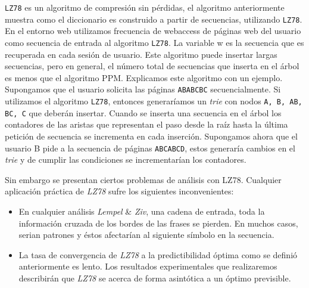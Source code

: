  


\texttt{LZ78} es un algoritmo de compresión sin pérdidas, el algoritmo anteriormente muestra  como el diccionario es construido  a partir de secuencias, utilizando \texttt{LZ78}. En el entorno web utilizamos frecuencia de webaccess de páginas web del usuario como secuencia de entrada al algoritmo \texttt{LZ78}. La variable w es la secuencia que es recuperada en cada sesión de usuario. Este algoritmo puede insertar largas secuencias, pero en general, el número total de secuencias que inserta en el árbol es menos que el algoritmo PPM. Explicamos este algoritmo con un ejemplo. Supongamos que el usuario solicita las páginas \texttt{ABABCBC} secuencialmente. Si utilizamos el algoritmo \texttt{LZ78}, entonces generaríamos un \emph{trie} con nodos  \texttt{A, B, AB, BC, C} que deberán insertar. 
Cuando se inserta una secuencia en el árbol los contadores de las aristas que representan el paso desde la raíz hasta la última petición de secuencia se incrementa en cada inserción. Supongamos ahora que el usuario B pide a la secuencia de páginas \texttt{ABCABCD}, estos generaría cambios en el \emph{trie} y de cumplir las condiciones se incrementarían los contadores. 






Sin embargo se presentan ciertos problemas de análisis con LZ78. Cualquier aplicación práctica de \emph{LZ78} sufre  los siguientes inconvenientes: 

\begin{itemize}
	\item En cualquier análisis \emph{Lempel} \& \emph{Ziv}, una cadena de entrada, toda la información cruzada de los bordes de las frases se pierden. En muchos casos, serian patrones y éstos afectarían al siguiente símbolo en la secuencia.
	
	\item La tasa de convergencia de \emph{LZ78} a la predictibilidad óptima como se definió anteriormente es lento. Los resultados experimentales que realizaremos  describirán que \emph{LZ78} se acerca de forma asintótica a un óptimo previsible.
	
	
	
\end{itemize}



